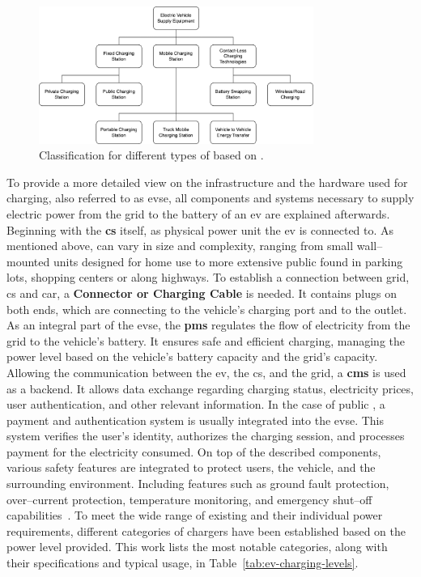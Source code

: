 \begin{figure}[h]
\centering
\includegraphics[width=0.8\textwidth,keepaspectratio]{resources/images/main/1_fundamentals/ChargingStationClassification.png}
\caption{Classification for different types of  based on \cite{afshar_literature_2020}.}
\label{fig:charging-station-classification}
\end{figure}

\noindent To provide a more detailed view on the infrastructure and the hardware used for charging, also referred to as \acrfull{evse}, all components and systems necessary to supply electric power from the grid to the battery of an \acrfull{ev} are explained afterwards.
Beginning with the \textbf{\acrfull{cs}} itself, as physical power unit the \acrshort{ev} is connected to. As mentioned above,  can vary in size and complexity, ranging from small wall--mounted units designed for home use to more extensive public  found in parking lots, shopping centers or along highways.
To establish a connection between grid, \acrshort{cs} and car, a \textbf{Connector or Charging Cable} is needed. It contains plugs on both ends, which are connecting to the vehicle's charging port and to the  outlet.
As an integral part of the \acrshort{evse}, the \textbf{\acrshort{pms}} regulates the flow of electricity from the grid to the vehicle's battery. It ensures safe and efficient charging, managing the power level based on the vehicle's battery capacity and the grid's capacity.
Allowing the communication between the \acrshort{ev}, the \acrfull{cs}, and the grid, a \textbf{\acrshort{cms}} is used as a backend. It allows data exchange regarding charging status, electricity prices, user authentication, and other relevant information.
In the case of public , a payment and authentication system is usually integrated into the \acrshort{evse}. This system verifies the user's identity, authorizes the charging session, and processes payment for the electricity consumed.
On top of the described components, various safety features are integrated to protect users, the vehicle, and the surrounding environment. Including features such as ground fault protection, over--current protection, temperature monitoring, and emergency shut--off capabilities~\cite{littlefuse_designing_2020}.
\noindent To meet the wide range of existing  and their individual power requirements, different categories of chargers have been established based on the power level provided. This work lists the most notable categories, along with their specifications and typical usage, in Table~\ref{tab:ev-charging-levels}.

